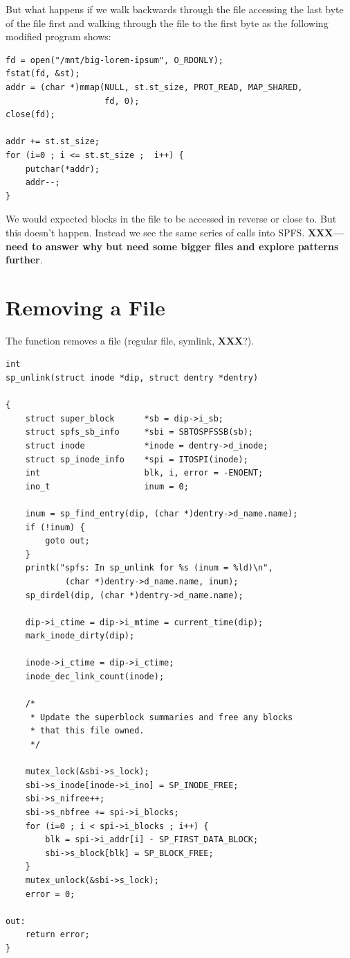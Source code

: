 \noindent
But what happens if we walk backwards through the file accessing the last byte of the file first and walking through the file to the first byte as the following modified program shows:

\begin{lstlisting}
fd = open("/mnt/big-lorem-ipsum", O_RDONLY);
fstat(fd, &st);
addr = (char *)mmap(NULL, st.st_size, PROT_READ, MAP_SHARED, 
                    fd, 0);
close(fd);

addr += st.st_size;
for (i=0 ; i <= st.st_size ;  i++) {
	putchar(*addr);
	addr--;
}
\end{lstlisting}

\noindent
We would expected blocks in the file to be accessed in reverse or close to. But this doesn't happen. Instead we see the same series of calls into SPFS. {\bfseries XXX---need to answer why but need some bigger files and explore patterns further}.


\section{Removing a File}

The  function removes a file (regular file, symlink, \textbf{XXX}?).

\begin{lstlisting}
int
sp_unlink(struct inode *dip, struct dentry *dentry)

{
    struct super_block      *sb = dip->i_sb;
    struct spfs_sb_info     *sbi = SBTOSPFSSB(sb);
    struct inode            *inode = dentry->d_inode;
    struct sp_inode_info    *spi = ITOSPI(inode); 
    int                     blk, i, error = -ENOENT;
    ino_t                   inum = 0;
    
    inum = sp_find_entry(dip, (char *)dentry->d_name.name);
    if (!inum) {
        goto out;
    }
    printk("spfs: In sp_unlink for %s (inum = %ld)\n",
            (char *)dentry->d_name.name, inum);
    sp_dirdel(dip, (char *)dentry->d_name.name);
        
    dip->i_ctime = dip->i_mtime = current_time(dip);
    mark_inode_dirty(dip);

    inode->i_ctime = dip->i_ctime;
    inode_dec_link_count(inode);

    /*
     * Update the superblock summaries and free any blocks
     * that this file owned.
     */

    mutex_lock(&sbi->s_lock);
    sbi->s_inode[inode->i_ino] = SP_INODE_FREE;
    sbi->s_nifree++;
    sbi->s_nbfree += spi->i_blocks;
    for (i=0 ; i < spi->i_blocks ; i++) {
        blk = spi->i_addr[i] - SP_FIRST_DATA_BLOCK;
        sbi->s_block[blk] = SP_BLOCK_FREE;
    }
    mutex_unlock(&sbi->s_lock);
    error = 0;

out:
    return error;
}
\end{lstlisting}


